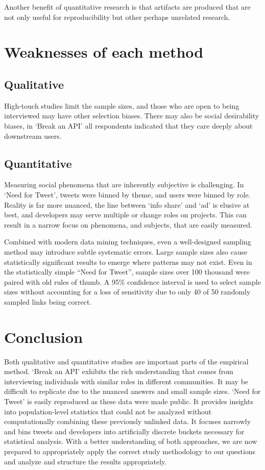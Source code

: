 \documentclass[12pt]{IEEEtran}
\begin{document}
Another benefit of quantitative research is that artifacts are produced that are not only useful for reproducibility but other perhaps unrelated research. 

\section{Weaknesses of each method}

\subsection{Qualitative}

High-touch studies limit the sample sizes, and those who are open to being interviewed may have other selection biases. There may also be social desirability biases, in `Break an API' all respondents indicated that they care deeply about downstream users.

\subsection{Quantitative}

Measuring social phenomena that are inherently subjective is challenging. In `Need for Tweet', tweets were binned by theme, and users were binned by role. Reality is far more nuanced, the line between `info share' and `ad' is elusive at best, and developers may serve multiple or change roles on projects. This can result in a narrow focus on phenomena, and subjects, that are easily measured.

Combined with modern data mining techniques, even a well-designed sampling method may introduce subtle systematic errors. Large sample sizes also cause statistically significant results to emerge where patterns may not exist. Even in the statistically simple ``Need for Tweet'', sample sizes over 100 thousand were paired with old rules of thumb. A 95\% confidence interval is used to select sample sizes without accounting for a loss of sensitivity due to only 40 of 50 randomly sampled links being correct. %

\section{Conclusion}

Both qualitative and quantitative studies are important parts of the empirical method. `Break an API' exhibits the rich understanding that comes from interviewing individuals with similar roles in different communities. It may be difficult to replicate due to the nuanced answers and small sample sizes. `Need for Tweet' is easily reproduced as these data were made public. It provides insights into population-level statistics that could not be analyzed without computationally combining these previously unlinked data. It focuses narrowly and bins tweets and developers into artificially discrete buckets necessary for statistical analysis. With a better understanding of both approaches, we are now prepared to appropriately apply the correct study methodology to our questions and analyze and structure the results appropriately.



\end{document}
